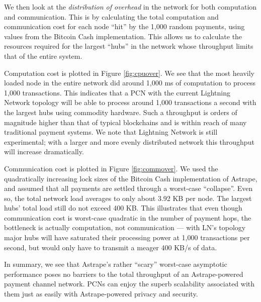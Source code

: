 \documentclass[USenglish,oneside,twocolumn]{article}
\begin{document}
We then look at the \emph{distribution of overhead} in the network for both computation and communication. This is by calculating the total computation and communication cost for each node ``hit'' by the 1,000 random payments, using values from the Bitcoin Cash implementation. This allows us to calculate the resources required for the largest ``hubs'' in the network whose throughput limits that of the entire system.

Computation cost is plotted in Figure \ref{fig:cpuover}. We see that the most heavily loaded node in the entire network did around 1,000 ms of computation to process 1,000 transactions. This indicates that a PCN with the current Lightning Network topology will be able to process around 1,000 transactions a second with the largest hubs using commodity hardware. Such a throughput is orders of magnitude higher than that of typical blockchains and is within reach of many traditional payment systems. We note that Lightning Network is still experimental; with a larger and more evenly distributed network this throughput will increase dramatically.

Communication cost is plotted in Figure \ref{fig:commover}. We used the quadratically increasing lock sizes of the Bitcoin Cash implementation of Astrape, and assumed that all payments are settled through a worst-case ``collapse''. Even so, the total network load averages to only about 3.92 KB per node. The largest hubs' total load still do not exceed 400 KB. This illustrates that even though communication cost is worst-case quadratic in the number of payment hops, the bottleneck is actually computation, not communication --- with LN's topology major hubs will have saturated their processing power at 1,000 transactions per second, but would only have to transmit a meager 400 KB/s of data.

In summary, we see that Astrape's rather ``scary'' worst-case asymptotic performance poses no barriers to the total throughput of an Astrape-powered payment channel network. PCNs can enjoy the superb scalability associated with them just as easily with Astrape-powered privacy and security.


\end{document}
